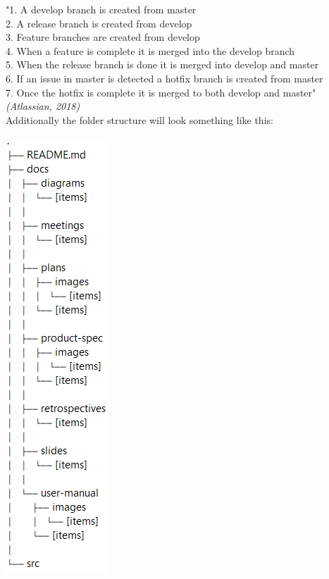 \documentclass[12pt]{article}%
\begin{document}
\noindent
"1. A develop branch is created from master \\
2. A release branch is created from develop \\
3. Feature branches are created from develop \\
4. When a feature is complete it is merged into the develop branch \\
5. When the release branch is done it is merged into develop and master \\
6. If an issue in master is detected a hotfix branch is created from master \\
7. Once the hotfix is complete it is merged to both develop and master" \\
\textit{(Atlassian, 2018)} \\

\noindent
Additionally the folder structure will look something like this: \\ \\
\includegraphics[scale=0.7]{structure.png}
\vspace{5mm}
\end{document}
